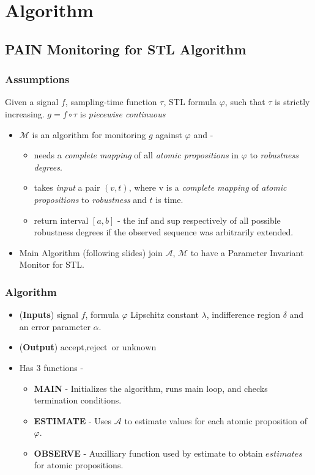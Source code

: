 \documentclass{beamer}
\newcommand{\accept}{\text{accept}}
\newcommand{\reject}{\text{reject}}
\newcommand{\unknown}{\text{unknown}}
\newcommand{\M}{\mathcal{M}}
\newcommand{\A}{\mathcal{A}}
\begin{document}
\section{Algorithm}
\subsection{PAIN Monitoring for STL Algorithm}
\begin{frame}
    \frametitle{Assumptions}
    Given a signal $f$, sampling-time function $\tau$,
    STL formula $\varphi$, such that $\tau$ is strictly
    increasing. $g = f \circ \tau$ is \textit{piecewise continuous}
    \begin{itemize}
        \item $\M$ is an algorithm for monitoring $g$ against $\varphi$ and -
        \begin{itemize}
            \item needs a \textit{complete mapping} of all \textit{atomic propositions}
            in $\varphi$ to \textit{robustness degrees}.
            \item takes \textit{input} a pair $(v, t)$,
            where v is a \textit{complete mapping} of \textit{atomic propositions}
            to \textit{robustness} and $t$ is time.
        \item return interval $[a, b]$ - the $\text{inf}$ and $\text{sup}$
            respectively of all possible robustness degrees if
            the observed sequence was arbitrarily extended.
        \end{itemize}
        \item Main Algorithm (following slides) join
            $\A$, $\M$ to have a Parameter Invariant Monitor
            for STL.
    \end{itemize}
\end{frame}

\begin{frame}
    \frametitle{Algorithm}
    \begin{itemize}
        \item (\textbf{Inputs}) signal $f$, formula $\varphi$
    Lipschitz constant $\lambda$, indifference region $\delta$ and an error parameter $\alpha$.
        \item (\textbf{Output}) $\accept, \reject$ or $\unknown$
        \item Has 3 functions -
            \begin{itemize}
                \item \textbf{MAIN} - Initializes the algorithm,
                    runs main loop, and checks termination conditions.
                \item \textbf{ESTIMATE} - Uses $\A$ to
                    estimate values for each atomic proposition of $\varphi$.
                \item \textbf{OBSERVE} - Auxilliary function used
                    by estimate to obtain $\textit{estimates}$ for
                    atomic propositions.
            \end{itemize}
    \end{itemize}
\end{frame}
\end{document}
